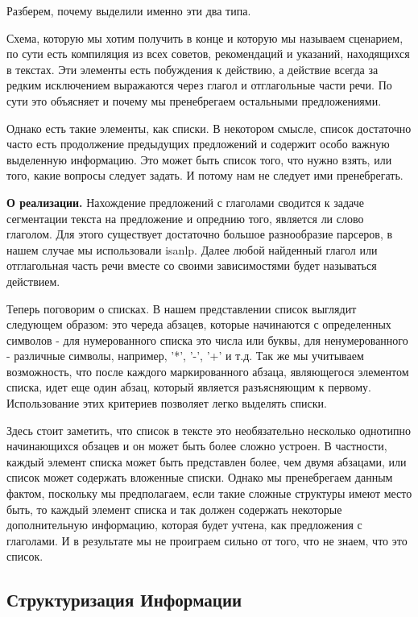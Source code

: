 \documentclass[12pt]{article}
\begin{document}
Разберем, почему выделили именно эти два типа.

Схема, которую мы хотим получить в конце и которую мы называем сценарием, по сути есть компиляция из всех советов, рекомендаций и указаний, находящихся в текстах. Эти элементы есть побуждения к действию, а действие всегда за редким исключением выражаются через глагол и отглагольные части речи. По сути это объясняет и почему мы пренебрегаем остальными предложениями.

Однако есть такие элементы, как списки. В некотором смысле, список достаточно часто есть продолжение предыдущих предложений и содержит особо важную выделенную информацию. Это может быть список того, что нужно взять, или того, какие вопросы следует задать. И потому нам не следует ими пренебрегать.

\textbf{О реализации.} Нахождение предложений с глаголами сводится к задаче сегментации текста на предложение и опреднию того, является ли слово глаголом. Для этого существует достаточно большое разнообразие парсеров, в нашем случае мы использовали isanlp. Далее любой найденный глагол или отглагольная часть речи вместе со своими зависимостями будет называться действием.

Теперь поговорим о списках. В нашем представлении список выглядит следующем образом: это череда абзацев, которые начинаются с определенных символов - для нумерованного списка это числа или буквы, для ненумерованного - различные символы, например, '*', '-', '+' и т.д. Так же мы учитываем возможность, что после каждого маркированного абзаца, являющегося элементом списка, идет еще один абзац, который является разъясняющим к первому. Использование этих критериев позволяет легко выделять списки.

Здесь стоит заметить, что список в тексте это необязательно несколько однотипно начинающихся обзацев и он может быть более сложно устроен. В частности, каждый элемент списка может быть представлен более, чем двумя абзацами, или список может содержать вложенные списки. Однако мы пренебрегаем данным фактом, поскольку мы предполагаем, если такие сложные структуры имеют место быть, то каждый элемент списка и так должен содержать некоторые дополнительную информацию, которая будет учтена, как предложения с глаголами. И в результате мы не проиграем сильно от того, что не знаем, что это список.



\subsection{Структуризация Информации}
\label{marker3}
\end{document}
